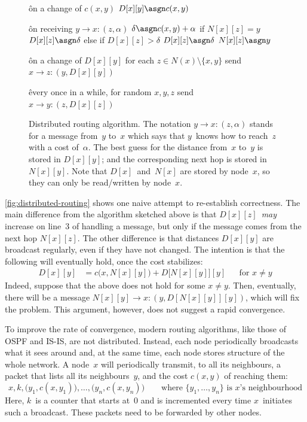 \begin{figure}
\begin{alg}
\^  on a change of $c(x,y)$
\0 $D[x][y] \asgn c(x,y)$
\end{alg}
\smallskip
\begin{alg}
\^  on receiving $y \to x : (z, \alpha)$
\0  $\delta \asgn c(x,y) + \alpha$
\0  if $N[x][z]=y$
\1    $D[x][z] \asgn \delta$
\0  else if $D[x][z] > \delta$
\1    $D[x][z] \asgn \delta$
\1    $N[x][z] \asgn y$
\end{alg}
\smallskip
\begin{alg}
\^  on a change of $D[x][y]$
\0  for each $z \in N(x)\setminus\{x,y\}$
\1    send $x \to z : (y, D[x][y])$
\end{alg}
\smallskip
\begin{alg}
\^  every once in a while, for random $x,y,z$
\0  send $x \to y : (z, D[x][z])$
\end{alg}
\caption{
  Distributed routing algorithm.
  The notation $y \to x : (z, \alpha)$ stands for a message from~$y$ to~$x$
    which says that $y$~knows how to reach~$z$ with a cost of~$\alpha$.
  The best guess for the distance from~$x$ to~$y$ is stored in $D[x][y]$;
    and the corresponding next hop is stored in $N[x][y]$.
  Note that $D[x]$~and~$N[x]$ are stored by node~$x$,
    so they can only be read/written by node~$x$.
}
\label{fig:distributed-routing}
\end{figure}

\autoref{fig:distributed-routing} shows one naive attempt to re-establish correctness.
The main difference from the algorithm sketched above
  is that $D[x][z]$~\emph{may} increase on line~3 of handling a message,
  but only if the message comes from the next hop $N[x][z]$.
The other difference is that distances $D[x][y]$ are broadcast regularly,
  even if they have not changed.
The intention is that the following will eventually hold, once the cost stabilizes:
\begin{align}
  D[x][y] &= c\bigl(x,N[x][y]\bigr) + D\bigl[N[x][y]\bigr][y]
    &&\text{for $x\ne y$}
\end{align}
Indeed, suppose that the above does not hold for some $x\ne y$.
Then, eventually, there will be a message $N[x][y] \to x : (y,D[N[x][y]][y])$,
  which will fix the problem.
This argument, however, does not suggest a rapid convergence.

\medskip

To improve the rate of convergence,
  modern routing algorithms, like those of OSPF and IS-IS, are not distributed.
Instead, each node periodically broadcasts what it sees around and,
  at the same time, each node stores structure of the whole network.
A node~$x$ will periodically transmit, to all its neighbours,
  a packet that lists all its neighbours~$y$, and the cost $c(x,y)$ of reaching them:
\[
  x, k, \bigl(y_1, c(x,y_1)\bigr), \ldots, \bigl(y_n, c(x,y_n)\bigr)
    \qquad\text{where $\{y_1,\ldots,y_n\}$ is $x$'s neighbourhood}
\]
Here, $k$~is a counter that starts at~$0$
  and is incremented every time $x$~initiates such a broadcast.
These packets need to be forwarded by other nodes.

